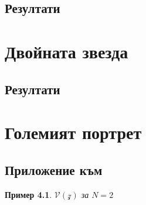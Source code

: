 \documentclass[12pt]{report}
\newtheorem{theorem}{Пример}
\numberwithin{equation}{section}
\numberwithin{figure}{section}
\begin{document}
    \section{Резултати}
\chapter{Двойната звезда}
    \section{Резултати}
\chapter{Големият портрет}

\begin{appendices}
    \chapter{Приложение към }
    
    \begin{theorem}
    \label{appendix:01}
        $\mathcal{V}(\mathcal{z})$ за $N=2$
    \end{theorem}
    

\end{appendices}
\end{document}
